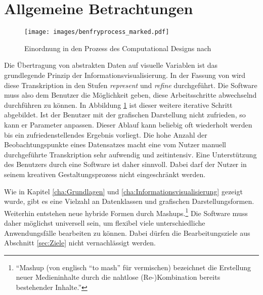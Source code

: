 \documentclass[a4paper, 
               12pt,
               DIV=calc,
               version=first,
               pdftex,
               headsepline,
               footsepline,
               bibliography=totocnumbered,
               listof=numbered]{scrreprt}
\begin{document}
\section{Allgemeine Betrachtungen}
\label{sec:AllgemeineBetrachtungen}
\begin{figure}
\centering
\texttt{[image: images/benfryprocess\_marked.pdf]}
\caption{Einordnung in den Prozess des Computational Designs nach \citep{BenFry}}
\label{fig:benfryprocess_marked}
\end{figure}
Die Übertragung von abstrakten Daten auf visuelle Variablen ist das grundlegende Prinzip der
Informationsvisualisierung. In der Fassung von \cite{BenFry} wird diese Transkription in den
Stufen \textit{represent} und \textit{refine} durchgeführt. Die Software muss also dem Benutzer die Möglichkeit geben,
diese Arbeitsschritte abwechselnd durchführen zu können. In Abbildung \ref{fig:benfryprocess_marked} ist dieser weitere iterative Schritt
abgebildet. Ist der Benutzer mit der grafischen Darstellung nicht zufrieden, so kann er Parameter anpassen. Dieser Ablauf
kann beliebig oft wiederholt werden bis ein zufriedenstellendes Ergebnis vorliegt.
Die hohe Anzahl der Beobachtungspunkte eines Datensatzes macht eine vom Nutzer manuell durchgeführte Transkription
sehr aufwendig und zeitintensiv. Eine Unterstützung des Benutzers durch eine Software ist daher sinnvoll.
Dabei darf der Nutzer in seinem kreativen Gestaltungsprozess nicht eingeschränkt werden.

Wie in Kapitel \ref{cha:Grundlagen} und \ref{cha:Informationsvisualisierung} gezeigt wurde, gibt es eine Vielzahl an
Datenklassen und grafischen Darstellungsformen. Weiterhin entstehen neue hybride Formen durch Mashups.\footnote{"`Mashup (von
englisch "`to mash"' für vermischen) bezeichnet die Erstellung neuer Medieninhalte durch die nahtlose
(Re-)Kombination bereits bestehender Inhalte."'\citep{wiki_mashup}}
Die Software muss daher möglichst universell sein, um flexibel viele unterschiedliche Anwendungsfälle
bearbeiten zu können. Dabei dürfen die Bearbeitungsziele aus Abschnitt \ref{sec:Ziele} nicht
vernachlässigt werden.
\end{document}
